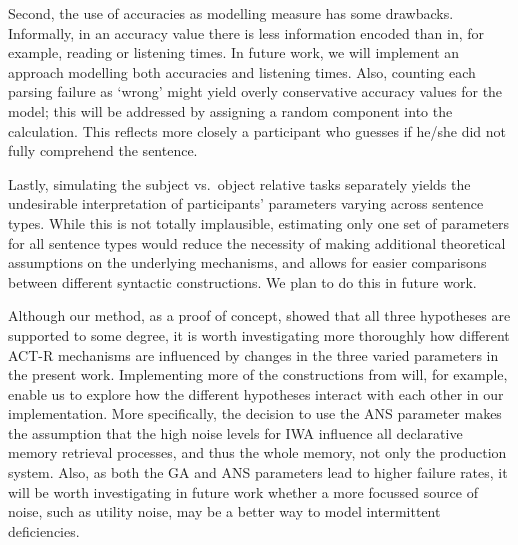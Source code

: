 \documentclass[10pt,letterpaper]{article}
\begin{document}

Second, the use of accuracies as modelling measure has some drawbacks. Informally, in an accuracy value there is less information encoded than in, for example, reading or listening times. In future work, we will implement an approach modelling both accuracies and listening times. Also, counting each parsing failure as `wrong' might yield overly conservative accuracy values for the model; this will be addressed by assigning a random component into the calculation. This reflects more closely a participant who guesses if he/she did not fully comprehend the sentence.

Lastly, simulating the subject vs.\ object relative tasks separately yields the undesirable interpretation of participants' parameters varying across sentence types. While this is not totally implausible, estimating only one set of parameters for all sentence types would reduce the necessity of making additional theoretical assumptions on the underlying mechanisms, and allows for easier comparisons between different syntactic constructions.  We plan to do this in future work.

Although our method, as a proof of concept, showed that all three hypotheses are supported to some degree, it is worth investigating more thoroughly how different ACT-R mechanisms are influenced by changes in the three varied parameters in the present work. Implementing more of the constructions from  will, for example, enable us to explore how the different hypotheses interact with each other in our implementation. 
More specifically, the decision to use the ANS parameter makes the assumption that the high noise levels for IWA influence all declarative memory retrieval processes, and thus the whole memory, not only the production system. Also, as both the GA and ANS parameters lead to higher failure rates, it will be worth investigating in future work whether a more focussed source of noise, such as utility noise, may be a better way to model intermittent deficiencies.
\end{document}
